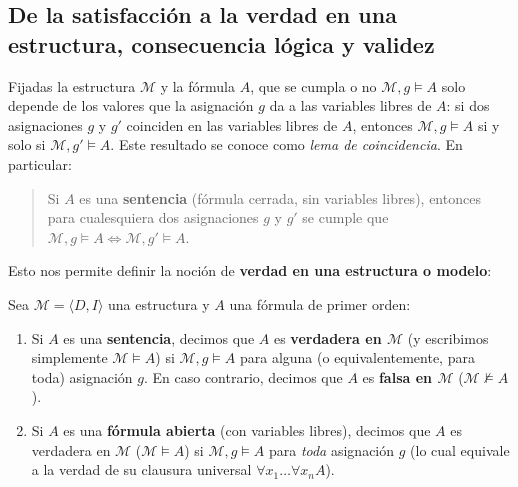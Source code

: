 \subsection{De la satisfacción a la verdad en una estructura, consecuencia lógica y validez}

Fijadas la estructura $\mathcal{M}$ y la fórmula $A$, que se cumpla o no $\mathcal{M}, g \models A$ solo depende de los valores que la asignación $g$ da a las variables libres de $A$: si dos asignaciones $g$ y $g'$ coinciden en las variables libres de $A$, entonces $\mathcal{M}, g \models A$ si y solo si $\mathcal{M}, g' \models A$. Este resultado se conoce como \emph{lema de coincidencia}. En particular:
\begin{quote}
Si $A$ es una \textbf{sentencia} (fórmula cerrada, sin variables libres), entonces para cualesquiera dos asignaciones $g$ y $g'$ se cumple que $\mathcal{M}, g \models A \iff \mathcal{M}, g' \models A$.
\end{quote}
Esto nos permite definir la noción de
\textbf{verdad en una estructura o modelo}:

\begin{definition}
Sea $\mathcal{M} = \langle D, I \rangle$ una estructura y $A$ una fórmula de primer orden:
\begin{enumerate}
    \item Si $A$ es una \textbf{sentencia}, decimos que $A$ es \textbf{verdadera en $\mathcal{M}$} (y escribimos simplemente $\mathcal{M} \models A$) si $\mathcal{M}, g \models A$ para alguna (o equivalentemente, para toda) asignación $g$. En caso contrario, decimos que $A$ es \textbf{falsa en $\mathcal{M}$} ($\mathcal{M} \not\models A$).
    \item Si $A$ es una \textbf{fórmula abierta} (con variables libres), decimos que $A$ es verdadera en $\mathcal{M}$ ($\mathcal{M} \models A$) si $\mathcal{M}, g \models A$ para \emph{toda} asignación $g$ (lo cual equivale a la verdad de su clausura universal $\forall x_1 \dots \forall x_n A$).
\end{enumerate}
\end{definition}

